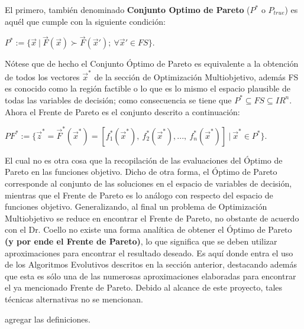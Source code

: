 \documentclass[class=report, crop=false]{standalone}
\begin{document}
El primero, también denominado \textbf{Conjunto Optimo de Pareto} 
($P^{*}$ o $P_{true}$) es aquél que cumple con la siguiente condición:\medskip\break
\centerline{$P^{*} := \{ \vec{x}\ |\ \vec{F}(\vec{x}) \succ \vec{F}(\vec{x}');\ \forall \vec{x}' \in FS \}$.}\medskip\break
Nótese que de hecho el Conjunto Óptimo de Pareto es equivalente 
a la obtención de todos los vectores $\vec{x}^{*}$ de la sección de 
Optimización Multiobjetivo, además FS es conocido como la región 
factible o lo que es lo mismo el espacio plausible de todas las 
variables de decisión; como consecuencia se tiene que $P^{*} \subseteq FS \subseteq IR^{n}$.\medskip\break
Ahora el Frente de Pareto es el conjunto descrito a continuación:\medskip\break
\centerline{$PF^{*} := \{ \vec{z}^{*} = \vec{F}^{*}(\vec{x}^{*}) = [f_1^{*}(\vec{x}^{*}),\ f_2^{*}(\vec{x}^{*}), ...,\ f_n^{*}(\vec{x}^{*})]\ |\ \vec{x}^{*} \in P^{*} \}$.}\medskip\break
El cual no es otra cosa que la recopilación de las evaluaciones 
del Óptimo de Pareto en las funciones objetivo.\break
Dicho de otra forma, el Óptimo de Pareto corresponde al conjunto 
de las soluciones en el espacio de variables de decisión, mientras 
que el Frente de Pareto es lo análogo con respecto del espacio de 
funciones objetivo.\medskip\break
Generalizando, al final un problema de Optimización Multiobjetivo 
se reduce en encontrar el Frente de Pareto, no obstante de acuerdo 
con el Dr. Coello \cite{b5} no existe una forma analítica de obtener 
el Óptimo de Pareto \textbf{(y por ende el Frente de Pareto)}, lo 
que significa que se deben utilizar aproximaciones para encontrar 
el resultado deseado.\break
Es aquí donde entra el uso de los Algoritmos Evolutivos descritos en 
la sección anterior, destacando además que esta es sólo una de las 
numerosas aproximaciones elaboradas \cite{b6} para encontrar el ya 
mencionado Frente de Pareto.\break
Debido al alcance de este proyecto, tales técnicas alternativas no 
se mencionan.


agregar las definiciones.

\end{document}
